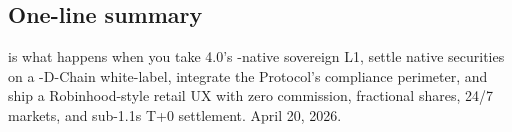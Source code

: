\subsection{One-line summary}

\Zoo{} \DEX{} is what happens when you take \Zoo{} 4.0's
\GPU{}-native sovereign L1, settle native securities on a
\Lux{}-D-Chain white-label, integrate the \Liquidity{} Protocol's
compliance perimeter, and ship a Robinhood-style retail UX with
zero commission, fractional shares, 24/7 markets, and sub-1.1s
T+0 settlement. April 20, 2026.
